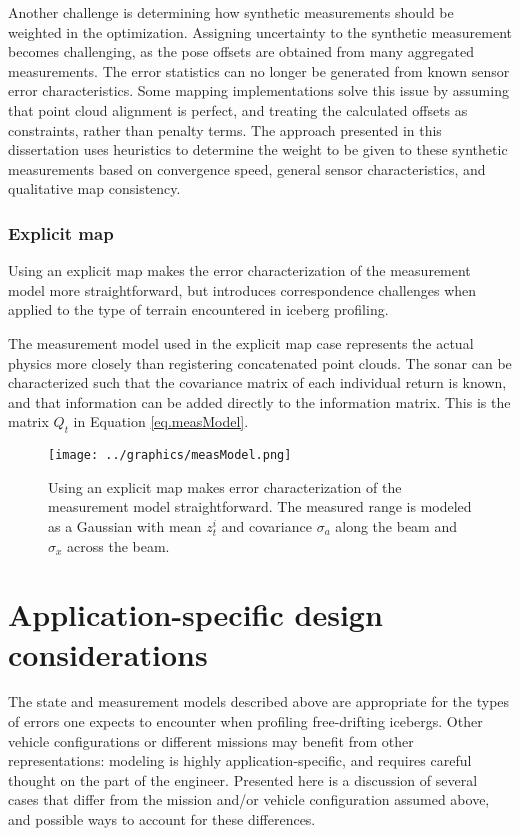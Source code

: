Another challenge is determining how synthetic measurements should be weighted in the optimization. Assigning uncertainty to the synthetic measurement becomes challenging, as the pose offsets are obtained from many aggregated measurements. The error statistics can no longer be generated from known sensor error characteristics. Some mapping implementations solve this issue by assuming that point cloud alignment is perfect, and treating the calculated offsets as constraints, rather than penalty terms. The approach presented in this dissertation uses heuristics to determine the weight to be given to these synthetic measurements based on convergence speed, general sensor characteristics, and qualitative map consistency. 



\subsubsection{Explicit map}

Using an explicit map makes the error characterization of the measurement model more straightforward, but introduces correspondence challenges when applied to the type of terrain encountered in iceberg profiling. 

The measurement model used in the explicit map case represents the actual physics more closely than registering concatenated point clouds. The sonar can be characterized such that the covariance matrix of each individual return is known, and that information can be added directly to the information matrix. This is the matrix $Q_t$ in Equation \ref{eq.measModel}.

\begin{figure}[htbp]
   \centering
   \texttt{[image: ../graphics/measModel.png]} %
   \caption{Using an explicit map makes error characterization of the measurement model straightforward. The measured range is modeled as a Gaussian with mean $z_t^i$ and covariance $\sigma_{a}$ along the beam and $\sigma_{x}$ across the beam.}
   \label{fig:GraphSLAMmeasModel}
\end{figure}


\section{Application-specific design considerations}

The state and measurement models described above are appropriate for the types of errors one expects to encounter when profiling free-drifting icebergs. Other vehicle configurations or different missions may benefit from other representations: modeling is highly application-specific, and requires careful thought on the part of the engineer. Presented here is a discussion of several cases that differ from the mission and/or vehicle configuration assumed above, and possible ways to account for these differences.

